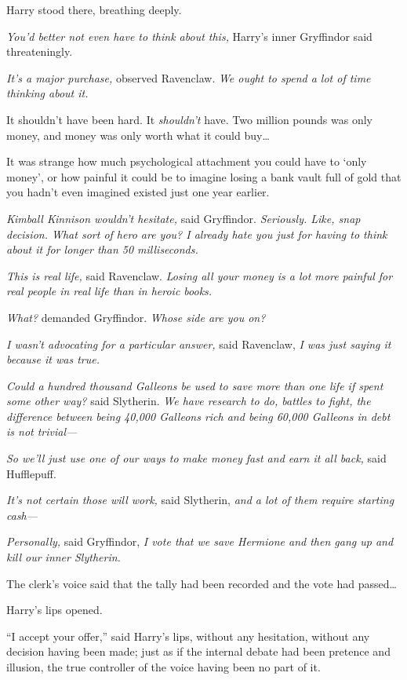 Harry stood there, breathing deeply.

\emph{You'd better not even have to think about this,} Harry's inner
Gryffindor said threateningly.

\emph{It's a major purchase,} observed Ravenclaw. \emph{We ought to
spend a lot of time thinking about it.}

It shouldn't have been hard. It \emph{shouldn't} have. Two million
pounds was only money, and money was only worth what it could
buy\ldots{}

It was strange how much psychological attachment you could have to `only
money', or how painful it could be to imagine losing a bank vault full
of gold that you hadn't even imagined existed just one year earlier.

\emph{Kimball Kinnison wouldn't hesitate,} said Gryffindor.
\emph{Seriously. Like, snap decision. What sort of hero are you? I
already hate you just for having to think about it for longer than 50
milliseconds.}

\emph{This is real life,} said Ravenclaw. \emph{Losing all your money is
a lot more painful for real people in real life than in heroic books.}

\emph{What?} demanded Gryffindor. \emph{Whose side are you on?}

\emph{I wasn't advocating for a particular answer,} said Ravenclaw,
\emph{I was just saying it because it was true.}

\emph{Could a hundred thousand Galleons be used to save more than one
life if spent some other way?} said Slytherin. \emph{We have research to
do, battles to fight, the difference between being 40,000 Galleons rich
and being 60,000 Galleons in debt is not trivial---}

\emph{So we'll just use one of our ways to make money fast and earn it
all back,} said Hufflepuff.

\emph{It's not certain those will work,} said Slytherin, \emph{and a lot
of them require starting cash---}

\emph{Personally,} said Gryffindor, \emph{I vote that we save Hermione
and then gang up and kill our inner Slytherin.}

The clerk's voice said that the tally had been recorded and the vote had
passed\ldots{}

Harry's lips opened.

``I accept your offer,'' said Harry's lips, without any hesitation,
without any decision having been made; just as if the internal debate
had been pretence and illusion, the true controller of the voice having
been no part of it.

